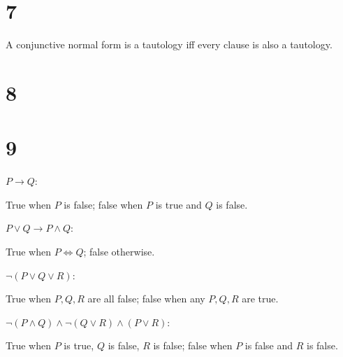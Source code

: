\documentclass[10pt]{article}
\begin{document}

\section*{7}
A conjunctive normal form is a tautology iff every clause is also a tautology.


\section*{8}


\section*{9}
\begin{description*}
  \item[$P\to Q$:] 

  True when $P$ is false; false when $P$ is true and $Q$ is false.

  \item[$P \lor Q \to P \land Q$:]

  True when $P\iff Q$; false otherwise.

  \item[$\lnot (P \lor Q \lor R)$:]

  True when $P,Q,R$ are all false; false when any $P,Q,R$ are true.

  \item[$\lnot (P \land Q) \land \lnot (Q \lor R) \land (P\lor R)$:]

  True when $P$ is true, $Q$ is false, $R$ is false; false when $P$ is false and $R$ is false.


\end{description*}
\end{document}
